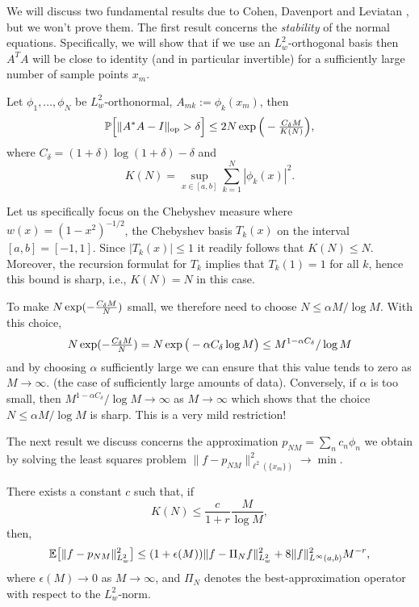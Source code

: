 We will discuss two fundamental results due to Cohen, Davenport and Leviatan
\cite{Cohen2013-yj}, but we won't prove them.  The first result concerns the
{\em stability} of the normal equations. Specifically, we will show that if we
use an $L^2_w$-orthogonal basis then $A^T A$ will be close to identity (and in
particular invertible) for a sufficiently large number of sample points $x_m$. 



\begin{theorem}[Stability] \label{th:lsq:randstab}
    Let $\phi_1, \dots, \phi_N$ be $L^2_w$-orthonormal, $A_{mk} := \phi_k(x_m)$, 
    then 
    \[
        \mathbb{P}\Big[ \| A^* A - I \|_{\rm op} > \delta\Big]
        \leq 2 N \exp\Big( - {\textstyle \frac{C_\delta M}{K(N)}}\Big), 
    \]
    where $C_\delta = (1+\delta) \log (1+\delta) - \delta$ and 
    \[
        K(N) = \sup_{x \in [a,b]} \sum_{k = 1}^N |\phi_k(x)|^2.
    \]
\end{theorem}

Let us specifically focus on the Chebyshev measure where $w(x) =
(1-x^2)^{-1/2}$, the Chebyshev basis $T_k(x)$ on the interval $[a,b]= [-1,1]$.
Since $|T_k(x)| \leq 1$ it readily follows that $K(N) \leq N$. Moreover, the
recursion formulat for $T_k$ implies that $T_k(1) = 1$ for all $k$, hence this
bound is sharp, i.e., $K(N) = N$ in this case. 

To make $N \exp( - {\textstyle \frac{C_\delta M}{N}})$ small, we therefore need 
to choose $N \leq \alpha M / \log M$. With this choice,
\[
    N \exp( - {\textstyle \frac{C_\delta M}{N}})
    = 
    N \exp\big( - \alpha C_\delta \log M\big)
    \leq 
    M^{1 -\alpha C_\delta} / \log M
\]
and by choosing $\alpha$ sufficiently large we can ensure that this value tends
to zero as $M \to \infty$. (the case of sufficiently large amounts of data).
Conversely, if $\alpha$ is too small, then $M^{1 -\alpha C_\delta} / \log M \to
\infty$ as $M \to \infty$ which shows that the choice $N \leq \alpha M/\log M$
is sharp. This is a very mild restriction!

The next result  we discuss concerns the approximation $p_{NM} = \sum_n c_n
\phi_n$ we obtain by solving the least squares problem $\| f - p_{NM}
\|_{\ell^2(\{x_m\})}^2 \to \min$.

\begin{theorem} \label{th:lsq:randerr}
    There exists a constant $c$ such that, if 
    \[
        K(N) \leq \frac{c}{1+r} \frac{M}{\log M},
    \]
    then, 
    \[
        \mathbb{E}\big[ \|f - p_{NM}\|_{L^2_w}^2 \big] 
        \leq 
        (1+\epsilon(M)) \|f - \Pi_N f\|_{L^2_w}^2 
        + 8 \|f\|_{L^\infty(a,b)}^2 M^{-r},
    \]  
    where $\epsilon(M) \to 0$ as $M \to \infty$, and $\Pi_N$ denotes the
    best-approximation operator with respect to the $L^2_w$-norm.
\end{theorem}

